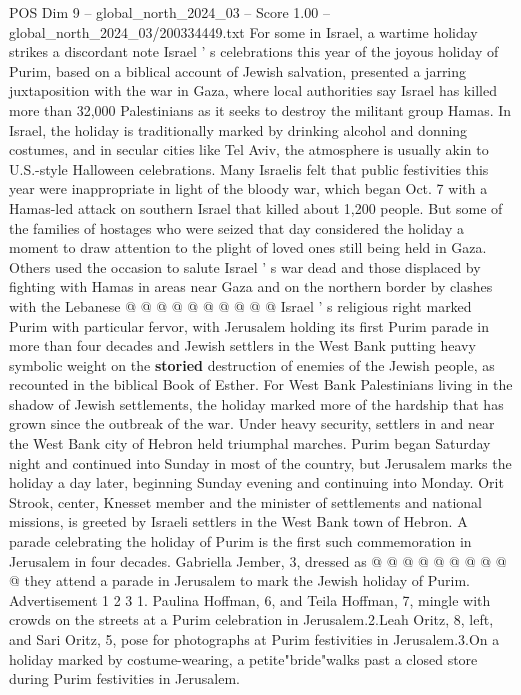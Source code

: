 \begin{textsample}{POS Dim 9 – global\_north\_2024\_03 – Score 1.00 – global\_north\_2024\_03/200334449.txt}  \label{ex:f9_pos_271}
For some in Israel, a wartime holiday strikes a discordant note Israel ' s celebrations this year of the joyous holiday of Purim, based on a biblical account of Jewish salvation, presented a jarring juxtaposition with the war in Gaza, where local authorities say Israel has killed more than 32,000 Palestinians as it seeks to destroy the militant group Hamas.
In Israel, the holiday is traditionally marked by drinking alcohol and donning costumes, and in secular cities like Tel Aviv, the atmosphere is usually akin to U.S.-style Halloween celebrations.
Many Israelis felt that public festivities this year were inappropriate in light of the bloody war, which began Oct. 7 with a Hamas-led attack on southern Israel that killed about 1,200 people.
But some of the families of hostages who were seized that day considered the holiday a moment to draw attention to the plight of loved ones still being held in Gaza.
Others used the occasion to salute Israel ' s war dead and those displaced by fighting with Hamas in areas near Gaza and on the northern border by clashes with the Lebanese @ @ @ @ @ @ @ @ @ @ Israel ' s religious right marked Purim with particular fervor, with Jerusalem holding its first Purim parade in more than four decades and Jewish settlers in the West Bank putting heavy symbolic weight on the \textbf{storied} destruction of enemies of the Jewish people, as recounted in the biblical Book of Esther.
For West Bank Palestinians living in the shadow of Jewish settlements, the holiday marked more of the hardship that has grown since the outbreak of the war.
Under heavy security, settlers in and near the West Bank city of Hebron held triumphal marches.
Purim began Saturday night and continued into Sunday in most of the country, but Jerusalem marks the holiday a day later, beginning Sunday evening and continuing into Monday.
Orit Strook, center, Knesset member and the minister of settlements and national missions, is greeted by Israeli settlers in the West Bank town of Hebron.
A parade celebrating the holiday of Purim is the first such commemoration in Jerusalem in four decades.
Gabriella Jember, 3, dressed as @ @ @ @ @ @ @ @ @ @ they attend a parade in Jerusalem to mark the Jewish holiday of Purim.
Advertisement 1 2 3 1.
Paulina Hoffman, 6, and Teila Hoffman, 7, mingle with crowds on the streets at a Purim celebration in Jerusalem.2.Leah Oritz, 8, left, and Sari Oritz, 5, pose for photographs at Purim festivities in Jerusalem.3.On a holiday marked by costume-wearing, a petite"bride"walks past a closed store during Purim festivities in Jerusalem.

\end{textsample}
